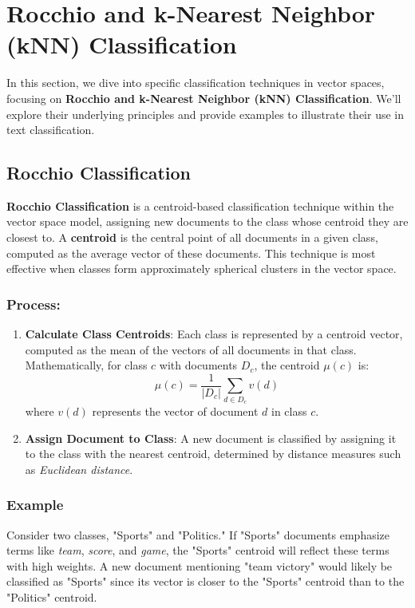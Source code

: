 \documentclass{article}
\begin{document}
\section{Rocchio and k-Nearest Neighbor (kNN) Classification}

In this section, we dive into specific classification techniques in vector spaces, focusing on \textbf{Rocchio and k-Nearest Neighbor (kNN) Classification}. We’ll explore their underlying principles and provide examples to illustrate their use in text classification.

\subsection{Rocchio Classification}

\textbf{Rocchio Classification} is a centroid-based classification technique within the vector space model, assigning new documents to the class whose centroid they are closest to. A \textbf{centroid} is the central point of all documents in a given class, computed as the average vector of these documents. This technique is most effective when classes form approximately spherical clusters in the vector space.

\subsubsection*{Process:}
\begin{enumerate}
    \item \textbf{Calculate Class Centroids}: Each class is represented by a centroid vector, computed as the mean of the vectors of all documents in that class. Mathematically, for class \(c\) with documents \(D_c\), the centroid \(\mu(c)\) is:
    \[
    \mu(c) = \frac{1}{|D_c|} \sum_{d \in D_c} v(d)
    \]
    where \(v(d)\) represents the vector of document \(d\) in class \(c\).
    
    \item \textbf{Assign Document to Class}: A new document is classified by assigning it to the class with the nearest centroid, determined by distance measures such as \textit{Euclidean distance}.
\end{enumerate}

\subsubsection*{Example}
Consider two classes, "Sports" and "Politics." If "Sports" documents emphasize terms like \textit{team}, \textit{score}, and \textit{game}, the "Sports" centroid will reflect these terms with high weights. A new document mentioning "team victory" would likely be classified as "Sports" since its vector is closer to the "Sports" centroid than to the "Politics" centroid.
\end{document}
